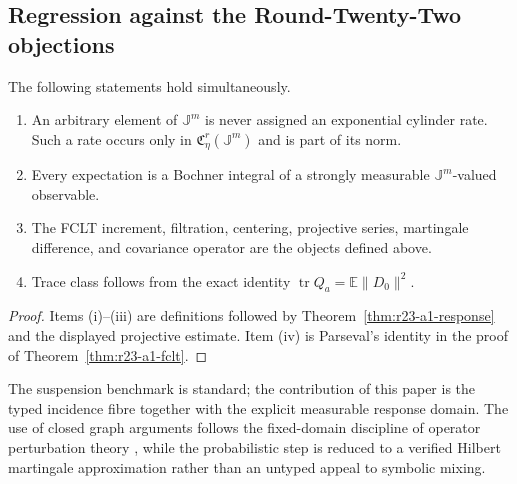 \subsection{Regression against the Round-Twenty-Two objections}

\begin{proposition}
\label{prop:r23-a1-regression}
The following statements hold simultaneously.
\begin{enumerate}[label=(\roman*)]
\item An arbitrary element of $\mathbb J^m$ is never assigned an exponential
cylinder rate.  Such a rate occurs only in
$\mathfrak C_\eta^r(\mathbb J^m)$ and is part of its norm.
\item Every expectation is a Bochner integral of a strongly measurable
$\mathbb J^m$-valued observable.
\item The FCLT increment, filtration, centering, projective series, martingale
difference, and covariance operator are the objects defined above.
\item Trace class follows from the exact identity
$\operatorname{tr}Q_a=\mathbb E\|D_0\|^2$.
\end{enumerate}
\end{proposition}

\begin{proof}
Items (i)--(iii) are definitions followed by
Theorem~\ref{thm:r23-a1-response} and the displayed projective estimate.
Item (iv) is Parseval's identity in the proof of
Theorem~\ref{thm:r23-a1-fclt}.
\end{proof}

The suspension benchmark is standard; the contribution of this paper is the
typed incidence fibre together with the explicit measurable response domain.
The use of closed graph arguments follows the fixed-domain discipline of
operator perturbation theory \cite{Kato1995}, while the probabilistic step is
reduced to a verified Hilbert martingale approximation rather than an
untyped appeal to symbolic mixing.

